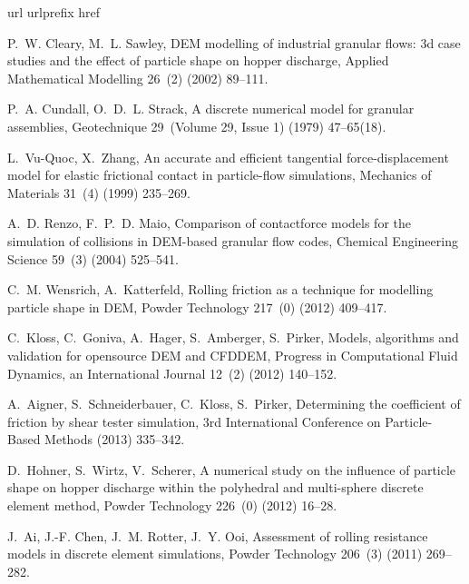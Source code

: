 \documentclass{llncs}
\begin{document}

\begin{thebibliography}{10}

\expandafter\ifx\csname url\endcsname\relax
  \def\url#1{\texttt{#1}}\fi
\expandafter\ifx\csname urlprefix\endcsname\relax\def\urlprefix{URL }\fi
\expandafter\ifx\csname href\endcsname\relax
  \def\href#1#2{#2} \def\path#1{#1}\fi

P.~W. Cleary, M.~L. Sawley, DEM modelling of industrial granular flows: 3d case
  studies and the effect of particle shape on hopper discharge, Applied
  Mathematical Modelling 26~(2) (2002) 89--111.

P.~A. Cundall, O.~D.~L. Strack, A discrete numerical model for granular
  assemblies, Geotechnique 29~(Volume 29, Issue 1) (1979) 47--65(18).

L.~Vu-Quoc, X.~Zhang, An accurate and efficient tangential force-displacement
  model for elastic frictional contact in particle-flow simulations, Mechanics
  of Materials 31~(4) (1999) 235--269.

A.~D. Renzo, F.~P.~D. Maio, Comparison of contactforce models for the
  simulation of collisions in DEM-based granular flow codes, Chemical
  Engineering Science 59~(3) (2004) 525--541.

C.~M. Wensrich, A.~Katterfeld, Rolling friction as a technique for modelling
  particle shape in DEM, Powder Technology 217~(0) (2012) 409--417.

C.~Kloss, C.~Goniva, A.~Hager, S.~Amberger, S.~Pirker, Models, algorithms and
  validation for opensource DEM and CFDDEM, Progress in Computational Fluid
  Dynamics, an International Journal 12~(2) (2012) 140--152.

A.~Aigner, S.~Schneiderbauer, C.~Kloss, S.~Pirker, Determining the coefficient
  of friction by shear tester simulation, 3rd International Conference on
  Particle-Based Methods (2013) 335--342.

D.~Hohner, S.~Wirtz, V.~Scherer, A numerical study on the influence of particle
  shape on hopper discharge within the polyhedral and multi-sphere discrete
  element method, Powder Technology 226~(0) (2012) 16--28.

J.~Ai, J.-F. Chen, J.~M. Rotter, J.~Y. Ooi, Assessment of rolling resistance
  models in discrete element simulations, Powder Technology 206~(3) (2011)
  269--282.


\end{thebibliography}
\end{document}
